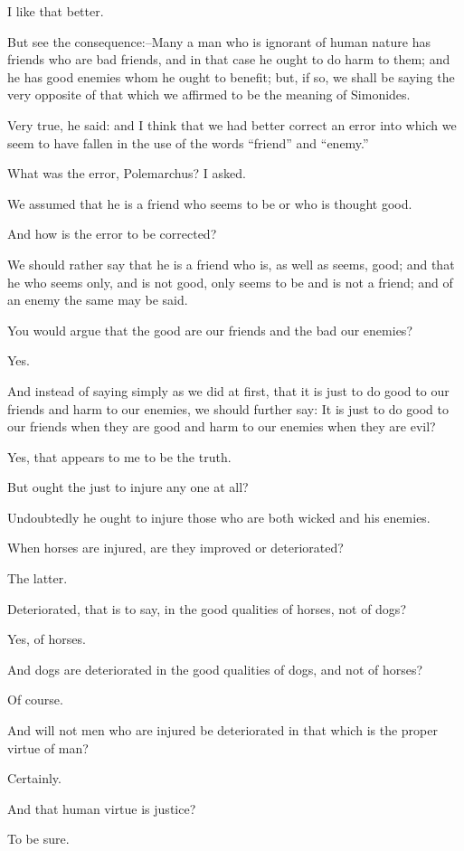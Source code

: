 I like that better.

But see the consequence:--Many a man who is ignorant of human nature
has friends who are bad friends, and in that case he ought to do harm to
them; and he has good enemies whom he ought to benefit; but, if so, we
shall be saying the very opposite of that which we affirmed to be the
meaning of Simonides.

Very true, he said: and I think that we had better correct an error
into which we seem to have fallen in the use of the words ``friend'' and
``enemy.''

What was the error, Polemarchus? I asked.

We assumed that he is a friend who seems to be or who is thought good.

And how is the error to be corrected?

We should rather say that he is a friend who is, as well as seems, good;
and that he who seems only, and is not good, only seems to be and is not
a friend; and of an enemy the same may be said.

You would argue that the good are our friends and the bad our enemies?

Yes.

And instead of saying simply as we did at first, that it is just to do
good to our friends and harm to our enemies, we should further say: It
is just to do good to our friends when they are good and harm to our
enemies when they are evil?

Yes, that appears to me to be the truth.

But ought the just to injure any one at all?

Undoubtedly he ought to injure those who are both wicked and his
enemies.

When horses are injured, are they improved or deteriorated?

The latter.

Deteriorated, that is to say, in the good qualities of horses, not of
dogs?

Yes, of horses.

And dogs are deteriorated in the good qualities of dogs, and not of
horses?

Of course.

And will not men who are injured be deteriorated in that which is the
proper virtue of man?

Certainly.

And that human virtue is justice?

To be sure.

